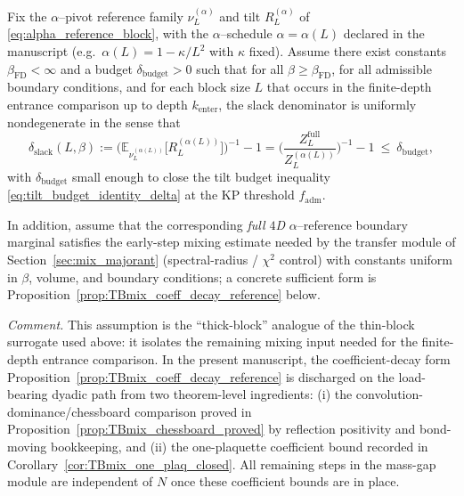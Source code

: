 \begin{proposition}\label{assump:FD_slack_mixing}
Fix the $\alpha$--pivot reference family $\nu_L^{(\alpha)}$ and tilt $R_L^{(\alpha)}$ of \eqref{eq:alpha_reference_block},
with the $\alpha$--schedule $\alpha=\alpha(L)$ declared in the manuscript (e.g.\ $\alpha(L)=1-\kappa/L^2$ with $\kappa$ fixed).
Assume there exist constants $\beta_{\mathrm{FD}}<\infty$ and a budget $\delta_{\mathrm{budget}}>0$ such that for all $\beta\ge\beta_{\mathrm{FD}}$,
for all admissible boundary conditions, and for each block size $L$ that occurs in the finite-depth entrance comparison up to
depth $k_{\mathrm{enter}}$, the slack denominator is uniformly nondegenerate in the sense that
\begin{equation}\label{eq:FD_slack_bound}
\delta_{\mathrm{slack}}(L,\beta):=\Big(\mathbb E_{\nu_L^{(\alpha(L))}}\!\big[R_L^{(\alpha(L))}\big]\Big)^{-1}-1
=\Big(\frac{Z_L^{\mathrm{full}}}{Z_L^{(\alpha(L))}}\Big)^{-1}-1
\ \le\ \delta_{\mathrm{budget}},
\end{equation}
with $\delta_{\mathrm{budget}}$ small enough to close the tilt budget inequality \eqref{eq:tilt_budget_identity_delta} at the KP threshold $f_{\mathrm{adm}}$.

In addition, assume that the corresponding \emph{full $4$D} $\alpha$--reference boundary marginal satisfies the early-step mixing estimate
needed by the transfer module of Section~\ref{sec:mix_majorant} (spectral-radius / $\chi^2$ control) with constants uniform in $\beta$,
volume, and boundary conditions; a concrete sufficient form is Proposition~\ref{prop:TBmix_coeff_decay_reference} below.
\end{proposition}

\noindent\emph{Comment.} This assumption is the ``thick-block'' analogue of the thin-block surrogate used above: it isolates the remaining mixing input needed for the finite-depth entrance comparison. In the present manuscript, the coefficient-decay form Proposition~\ref{prop:TBmix_coeff_decay_reference} is discharged on the load-bearing dyadic path from two theorem-level ingredients: (i) the convolution-dominance/chessboard comparison proved in Proposition~\ref{prop:TBmix_chessboard_proved} by reflection positivity and bond-moving bookkeeping, and (ii) the one-plaquette coefficient bound recorded in Corollary~\ref{cor:TBmix_one_plaq_closed}. All remaining steps in the mass-gap module are independent of $N$ once these coefficient bounds are in place.



